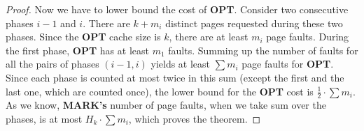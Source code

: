 \begin{proof}
Now we have to lower bound the cost of \textbf{OPT}. Consider two consecutive 
phases $i-1$ and $i$. There are $k + m_i$ distinct pages requested during these two 
phases. Since the \textbf{OPT} cache size is $k$, there are at least $m_i$ page faults. 
During the first phase, \textbf{OPT} has at least $m_1$ faults. Summing up the 
number of faults for all
the pairs of phases $(i-1, i)$ yields at least $\sum m_i$ page faults for \textbf{OPT}. Since each phase 
is counted at most twice in this sum
(except the first and the last one, which are counted once), the lower bound for the 
\textbf{OPT} cost is $\frac{1}{2} \cdot \sum m_i$. As we know, \textbf{MARK's} 
number of page faults, when we take sum over the phases, is at most $H_k \cdot \sum 
m_i$, which proves the theorem.
\end{proof}
